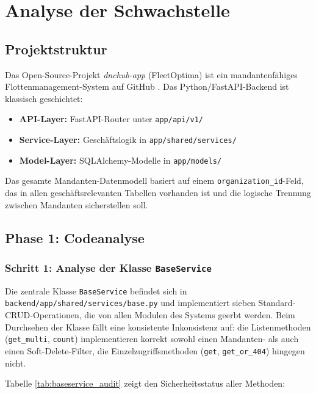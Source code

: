 \section{Analyse der Schwachstelle}
\label{sec:analyse}

\subsection{Projektstruktur}

Das Open-Source-Projekt \emph{dnchub-app} (FleetOptima) ist ein mandantenfähiges
Flottenmanagement-System auf GitHub \cite{github_issue_5}. Das Python/FastAPI-Backend
ist klassisch geschichtet:

\begin{itemize}
    \item \textbf{API-Layer:} FastAPI-Router unter \texttt{app/api/v1/}
    \item \textbf{Service-Layer:} Geschäftslogik in \texttt{app/shared/services/}
    \item \textbf{Model-Layer:} SQLAlchemy-Modelle in \texttt{app/models/}
\end{itemize}

Das gesamte Mandanten-Datenmodell basiert auf einem \texttt{organization\_id}-Feld,
das in allen geschäftsrelevanten Tabellen vorhanden ist und die logische Trennung
zwischen Mandanten sicherstellen soll.

\subsection{Phase 1: Codeanalyse}

\subsubsection{Schritt 1: Analyse der Klasse \texttt{BaseService}}

Die zentrale Klasse \texttt{BaseService} befindet sich in
\texttt{backend/app/shared/services/base.py} und implementiert sieben
Standard-CRUD-Operationen, die von allen Modulen des Systems geerbt werden.
Beim Durchsehen der Klasse fällt eine konsistente Inkonsistenz auf:
die Listenmethoden (\texttt{get\_multi}, \texttt{count}) implementieren korrekt
sowohl einen Mandanten- als auch einen Soft-Delete-Filter, die
Einzelzugriffsmethoden (\texttt{get}, \texttt{get\_or\_404}) hingegen nicht.

Tabelle \ref{tab:baseservice_audit} zeigt den Sicherheitsstatus aller Methoden:

